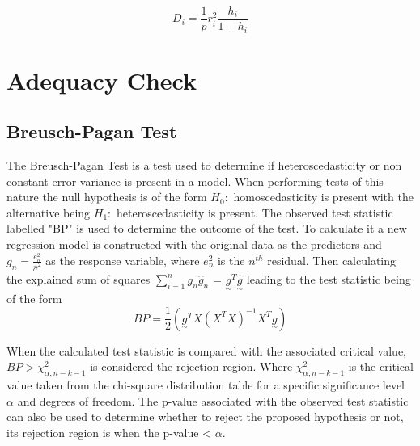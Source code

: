\documentclass[12pt]{report}
\begin{document}
\begin{equation} \label{CDSim}
    D_i = \frac{1}{p}r_i^2\frac{h_i}{1-{h_i}}
\end{equation}

\section{Adequacy Check}
\subsection{Breusch-Pagan Test}
The Breusch-Pagan Test is a test used to determine if heteroscedasticity or non constant error variance is present in a model. When performing tests of this nature the null hypothesis is of the form $H_{0}:$ homoscedasticity is present with the alternative being $H_{1}:$ heteroscedasticity is present. The observed test statistic labelled "BP" is used to determine the outcome of the test. To calculate it a new regression model is constructed with the original data as the predictors and $g_{n} =\frac{e_{n}^2}{\hat{\sigma}^2}$ as the response variable, where $e_{n}^2$ is the $n^{th}$ residual. Then calculating the explained sum of squares $\sum_{i=1}^n g_{n}\hat{g}_{n}$ = $\underset{\sim}{g}^T\hat{\underset{\sim}{g}}$ leading to the test statistic being of the form
\begin{equation}
    BP = \frac{1}{2}(\underset{\sim}{g}^TX(X^{T}X)^{-1}X^{T}\underset{\sim}g)
\end{equation}

When the calculated test statistic is compared with the associated critical value, \\$BP > \chi^{2}_{\alpha,n-k-1}$ is considered the rejection region. Where $\chi^{2}_{\alpha,n-k-1}$ is the critical value taken from the chi-square distribution table for a specific significance level $\alpha$ and degrees of freedom. The p-value associated with the observed test statistic can also be used to determine whether to reject the proposed hypothesis or not, its rejection region is when the p-value < $\alpha$.
\end{document}
